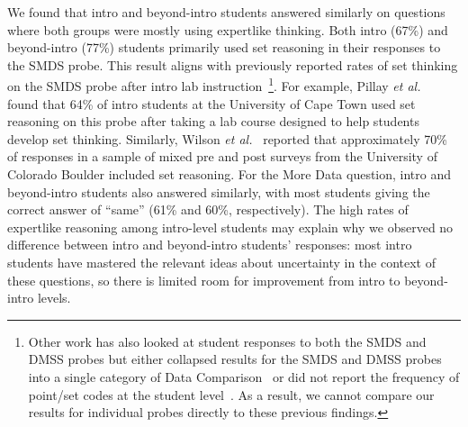 \documentclass[english,aps,prstper,reprint,showpacs,longbibliography,superscriptaddress,nofootinbib]{revtex4-2}
\begin{document}
We found that intro and beyond-intro students answered similarly on questions where both groups were mostly using expertlike thinking. Both intro (67\%) and beyond-intro (77\%) students primarily used set reasoning in their responses to the SMDS probe. This result aligns with previously reported rates of set thinking on the SMDS probe after intro lab instruction~\footnote{Other work has also looked at student responses to both the SMDS and DMSS probes but either collapsed results for the SMDS and DMSS probes into a single category of Data Comparison~\cite{Lubben2001,Buffler2001}  or did not report the frequency of point/set codes at the student level~\cite{Pollard2020}. As a result, we cannot compare our results for individual probes directly to these previous findings.}. For example, Pillay \textit{et al.}~\cite{Pillay2008} found that 64\% of intro students at the University of Cape Town used set reasoning on this probe after taking a lab course designed to help students develop set thinking. Similarly, Wilson \textit{et al.}~\cite{Wilson2022} reported that approximately 70\% of responses in a sample of mixed pre and post surveys from the University of Colorado Boulder included set reasoning. For the More Data question, intro and beyond-intro students also answered similarly, with most students giving the correct answer of ``same'' (61\% and 60\%, respectively). The high rates of expertlike reasoning among intro-level students may explain why we observed no difference between intro and beyond-intro students' responses: most intro students have mastered the relevant ideas about uncertainty in the context of these questions, so there is limited room for improvement from intro to beyond-intro levels.
 
\end{document}
